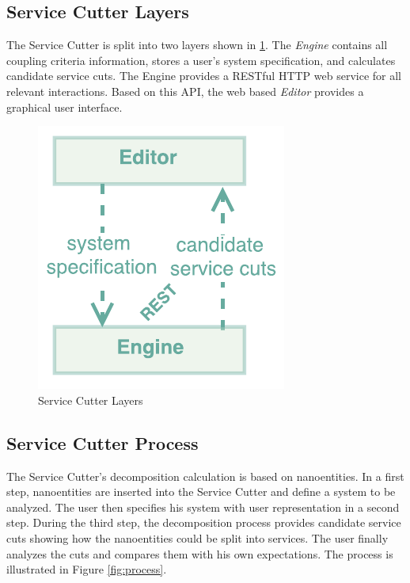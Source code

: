 \subsection{Service Cutter Layers}

\begin{minipage}[t]{0.5\textwidth}
	\setlength{\parskip}{5pt plus 0.1pt}	
	The Service Cutter is split into two layers shown in \ref{fig:overviewLayers}. The \textit{Engine} contains all coupling criteria information, stores a user's system specification, and calculates candidate service cuts. The Engine provides a RESTful HTTP web service for all relevant interactions. Based on this \gls{API}, the web based \textit{Editor} provides a graphical user interface.
\end{minipage}
\begin{minipage}[t]{0.5\textwidth}	
	\begin{figure}[H]
		\begin{center}
		\includegraphics[scale=1]{diagrams/overviewLayers.pdf}
		\caption{Service Cutter Layers}
		\label{fig:overviewLayers}
		\end{center}
	\end{figure}
\end{minipage}

\subsection{Service Cutter Process}

The Service Cutter's decomposition calculation is based on nanoentities. In a first step, nanoentities are inserted into the Service Cutter and define a system to be analyzed. The user then specifies his system with user representation in a second step. During the third step, the decomposition process provides candidate service cuts showing how the nanoentities could be split into services. The user finally analyzes the cuts and compares them with his own expectations. The process is illustrated in Figure \ref{fig:process}.

